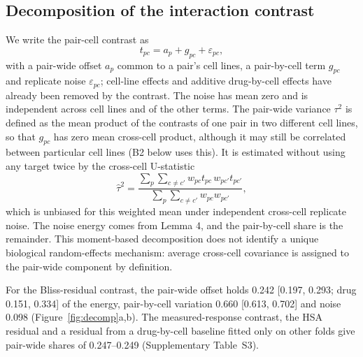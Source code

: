 \documentclass[11pt]{article}
\begin{document}
\subsection{Decomposition of the interaction contrast}\label{sec:decomp}
We write the pair-cell contrast as
\begin{equation}\label{eq:decomp}
t_{pc}=a_p+g_{pc}+\varepsilon_{pc},
\end{equation}
with a pair-wide offset $a_p$ common to a pair's cell lines, a pair-by-cell term $g_{pc}$ and replicate noise $\varepsilon_{pc}$; cell-line effects and additive drug-by-cell effects have already been removed by the contrast. The noise has mean zero and is independent across cell lines and of the other terms. The pair-wide variance $\tau^2$ is defined as the mean product of the contrasts of one pair in two different cell lines, so that $g_{pc}$ has zero mean cross-cell product, although it may still be correlated between particular cell lines (B2 below uses this). It is estimated without using any target twice by the cross-cell U-statistic
\begin{equation}\label{eq:ustat}
\hat\tau^2=\frac{\sum_p\sum_{c\neq c'}w_{pc}t_{pc}\,w_{pc'}t_{pc'}}{\sum_p\sum_{c\neq c'}w_{pc}w_{pc'}},
\end{equation}
which is unbiased for this weighted mean under independent cross-cell replicate noise. The noise energy comes from Lemma 4, and the pair-by-cell share is the remainder. This moment-based decomposition does not identify a unique biological random-effects mechanism: average cross-cell covariance is assigned to the pair-wide component by definition.

For the Bliss-residual contrast, the pair-wide offset holds 0.242 [0.197, 0.293; drug 0.151, 0.334] of the energy, pair-by-cell variation 0.660 [0.613, 0.702] and noise 0.098 (Figure~\ref{fig:decomp}a,b). The measured-response contrast, the HSA residual and a residual from a drug-by-cell baseline fitted only on other folds give pair-wide shares of 0.247–0.249 (Supplementary Table~S3).
\end{document}
